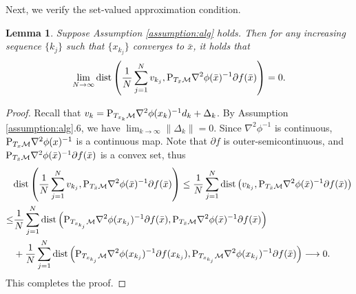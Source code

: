 \documentclass[11pt]{article}
\newcommand{\cM}{\mathcal M}
\def\norm#1{\left\|#1\right\|}
\newtheorem{lemma}{Lemma}[section]
\def\dist{{\rm dist}}
\begin{document}
Next, we verify the set-valued approximation condition. 

\begin{lemma}
\label{le:d_ass}
Suppose Assumption \ref{assumption:alg} holds. Then 
for any increasing sequence $\{k_j\}$ such that $\{x_{k_j}\}$ converges to $\bar x$, it holds that 
    \[  \lim_{N\rightarrow\infty}\dist\left(\frac{1}{N}\sum_{j=1}^Nv_{k_j},{\rm P}_{T_{\bar x}\cM}\nabla^2\phi(\bar x)^{-1}\partial f(\bar x)  \right)=0.
    \]
\end{lemma}
\begin{proof}
Recall that $v_k={\rm P}_{T_{x_k}\cM}\nabla^2\phi(x_k)^{-1}d_k+\Delta_k$. By Assumption \ref{assumption:alg}.6, we have $\lim_{k\to\infty}\norm{\Delta_k}=0$. Since $\nabla^2\phi^{-1}$ is continuous, ${\rm P}_{T_{x}\cM}\nabla^2\phi(x)^{-1}$ is a continuous map. Note that $\partial f$ is outer-semicontinuous, and ${\rm P}_{T_{\bar x}\cM}\nabla^2\phi(\bar x)^{-1}\partial f(\bar x)$ is a convex set, thus 
\[
\begin{aligned}
&\dist\left(\frac{1}{N}\sum_{j=1}^Nv_{k_j},{\rm P}_{T_{\bar x}\cM}\nabla^2\phi(\bar x)^{-1}\partial f(\bar x)  \right)\leq\frac{1}{N}\sum_{j=1}^N \dist\left(v_{k_j},{\rm P}_{T_{\bar x}\cM}\nabla^2\phi(\bar x)^{-1}\partial f(\bar x)  \right)\\
\leq&\frac{1}{N}\sum_{j=1}^N \dist\left({\rm P}_{T_{ x_{k_j}}\cM}\nabla^2\phi( x_{k_j})^{-1}\partial f(\bar x),{\rm P}_{T_{\bar x}\cM}\nabla^2\phi(\bar x)^{-1}\partial f(\bar x)  \right)\\
&+\frac{1}{N}\sum_{j=1}^N \dist\left({\rm P}_{T_{ x_{k_j}}\cM}\nabla^2\phi( x_{k_j})^{-1}\partial f(x_{k_j}),{\rm P}_{T_{ x_{k_j}}\cM}\nabla^2\phi( x_{k_j})^{-1}\partial f(\bar x)  \right)\longrightarrow0.
\end{aligned}
\]
This completes the proof.
\end{proof}
\end{document}
